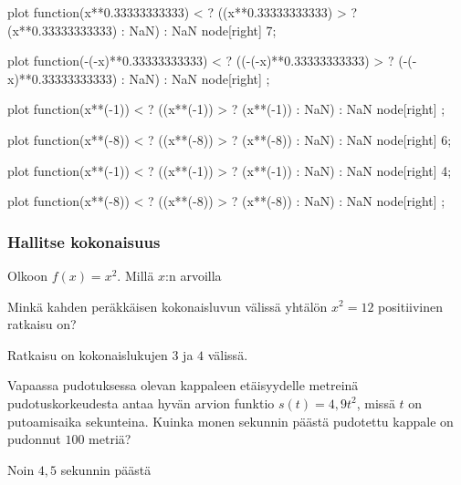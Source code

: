 \begin{tehtavasivu}
\begin{tehtava}
\begin{center}
	\begin{kuvaajapohja}{0.9}{-3.5}{3.5}{-3.5}{3.5}
	
	\newcommand{\kuvaajaneg}[3]{
\draw[smooth,color=#3,thick,domain=\kuvaajaminx:-0.01,scale=\kuvaajascale,samples=300] plot function{(#1) < \kuvaajamaxy ? ((#1) > \kuvaajaminy ? (#1) : NaN) : NaN} node[right] {#2};}
\newcommand{\kuvaajapos}[3]{
\draw[smooth,color=#3,thick,domain=0.01:\kuvaajamaxx,scale=\kuvaajascale,samples=300] plot function{(#1) < \kuvaajamaxy ? ((#1) > \kuvaajaminy ? (#1) : NaN) : NaN} node[right] {#2};}
	 \kuvaajapos{x**0.33333333333}{7}{blue}
	 \kuvaajaneg{-(-x)**0.33333333333}{}{blue}
	 \kuvaajaneg{x**(-1)}{}{violet}
	 \kuvaajaneg{x**(-8)}{6}{orange}
	 \kuvaajapos{x**(-1)}{4}{violet}
	 \kuvaajapos{x**(-8)}{}{orange}
	\end{kuvaajapohja}
\end{center}

	\begin{vastaus}
	\end{vastaus}
\end{tehtava}

\subsubsection*{Hallitse kokonaisuus}

\begin{tehtava}
Olkoon $f(x)=x^2$. Millä $x$:n arvoilla
	\begin{vastaus}
	\end{vastaus}
\end{tehtava}

\begin{tehtava}
Minkä kahden peräkkäisen kokonaisluvun välissä yhtälön $x^2 = 12$ positiivinen ratkaisu on?
	\begin{vastaus}
Ratkaisu on kokonaislukujen $3$ ja $4$ välissä.
	\end{vastaus}
\end{tehtava}

\begin{tehtava}
Vapaassa pudotuksessa olevan kappaleen etäisyydelle metreinä pudotuskorkeudesta antaa hyvän arvion funktio $ s(t)=4,9t^{2}$, missä $t$ on putoamisaika sekunteina. Kuinka monen sekunnin päästä pudotettu kappale on pudonnut $100$ metriä?
	\begin{vastaus}
Noin $4,5$ sekunnin päästä
	\end{vastaus}
\end{tehtava}


\end{tehtavasivu}
